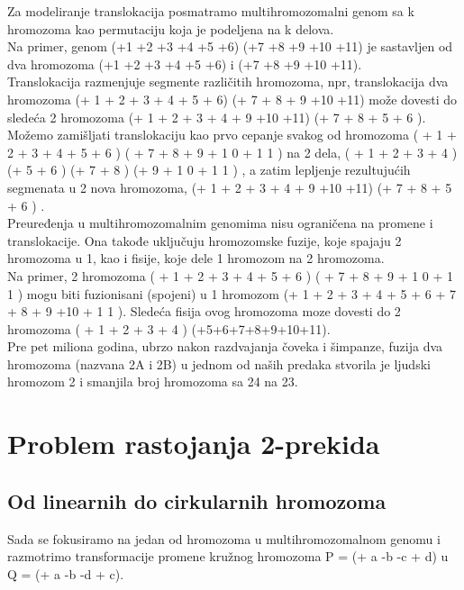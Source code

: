 \documentclass{article}
\begin{document}
Za modeliranje translokacija posmatramo multihromozomalni genom sa k hromozoma
kao permutaciju koja je podeljena na k delova.\\

Na primer, genom
(+1 +2 +3 +4 +5 +6) (+7 +8 +9 +10 +11) je sastavljen od dva hromozoma (+1
+2 +3 +4 +5 +6) i (+7 +8 +9 +10 +11). \\

Translokacija razmenjuje segmente
različitih hromozoma, npr, translokacija dva hromozoma
(+ 1 + 2 + 3 + 4 + 5 + 6) (+ 7 + 8 + 9 +10 +11)
može dovesti do sledeća 2 hromozoma
(+ 1 + 2 + 3 + 4 + 9 +10 +11) (+ 7 + 8 + 5 + 6 ).
Možemo zamišljati translokaciju kao prvo cepanje svakog od hromozoma
( + 1 + 2 + 3 + 4 + 5 + 6 ) ( + 7 + 8 + 9 + 1 0 + 1 1 )
na 2 dela,
( + 1 + 2 + 3 + 4 ) (+ 5 + 6 ) (+ 7 + 8 ) (+ 9 + 1 0 + 1 1 ) ,
a zatim lepljenje rezultujućih segmenata u 2 nova hromozoma,
(+ 1 + 2 + 3 + 4 + 9 +10 +11) (+ 7 + 8 + 5 + 6 ) .\\

Preuređenja u multihromozomalnim genomima nisu ograničena na promene i translokacije. Ona takođe uključuju hromozomske fuzije, koje spajaju 2 hromozoma u 1, kao i fisije, koje dele 1 hromozom na 2 hromozoma.\\

Na primer, 2 hromozoma
( + 1 + 2 + 3 + 4 + 5 + 6 ) ( + 7 + 8 + 9 + 1 0 + 1 1 ) mogu biti fuzionisani (spojeni) u 1 hromozom (+ 1 + 2 + 3 + 4 + 5 + 6 + 7 + 8 + 9 +10 + 1 1 ).
Sledeća fisija ovog hromozoma moze dovesti do 2 hromozoma ( + 1 + 2 + 3 + 4 ) (+5+6+7+8+9+10+11).\\

Pre pet miliona godina, ubrzo nakon razdvajanja čoveka i šimpanze, fuzija
dva hromozoma (nazvana 2A i 2B) u jednom od naših predaka stvorila je ljudski hromozom 2 i smanjila broj hromozoma sa 24 na 23.

\newpage
\section{Problem rastojanja 2-prekida}

\subsection{Od linearnih do cirkularnih hromozoma}

\indent Sada se fokusiramo na jedan od hromozoma u multihromozomalnom genomu i razmotrimo transformacije promene kružnog hromozoma P = (+ a -b -c + d) u Q = (+ a -b
-d + c). \\
\end{document}
